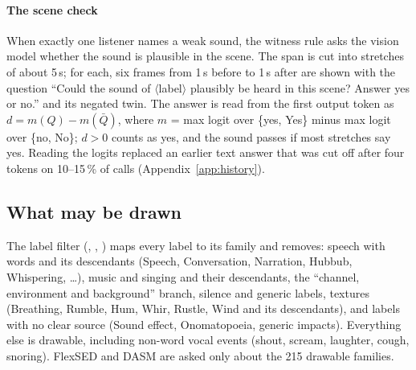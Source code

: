 \paragraph{The scene check}\label{sec:scenecheck}
When exactly one listener names a weak sound, the witness rule asks the vision model whether the sound is plausible
in the scene. The span is cut into stretches of about 5\,s; for each, six frames from 1\,s before to 1\,s after are
shown with the question ``Could the sound of $\langle$label$\rangle$ plausibly be heard in this scene? Answer yes or
no.'' and its negated twin. The answer is read from the first output token as
$d = m(Q) - m(\bar Q)$, where $m$ = max logit over \{yes, Yes\} minus max logit over \{no, No\}; $d>0$ counts as yes,
and the sound passes if most stretches say yes. Reading the logits replaced an earlier text answer that was cut
off after four tokens on 10--15\,\% of calls (Appendix~\ref{app:history}).


\subsection{What may be drawn}\label{sec:labelfilter}
The label filter (, , ) maps every
label to its family and removes: speech with words and its descendants (Speech, Conversation, Narration, Hubbub,
Whispering, \ldots), music and singing and their descendants, the ``channel, environment and background'' branch,
silence and generic labels, textures (Breathing, Rumble, Hum, Whir, Rustle, Wind and its descendants), and labels
with no clear source (Sound effect, Onomatopoeia, generic impacts). Everything else is drawable, including non-word
vocal events (shout, scream, laughter, cough, snoring). FlexSED and DASM are asked only about the 215 drawable families.


